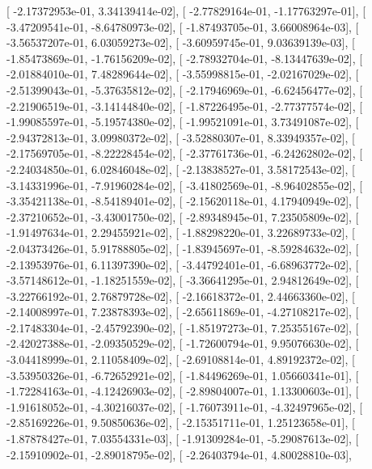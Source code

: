 \documentclass{article}
\begin{document}
       [ -2.17372953e-01,   3.34139414e-02],
       [ -2.77829164e-01,  -1.17763297e-01],
       [ -3.47209541e-01,  -8.64780973e-02],
       [ -1.87493705e-01,   3.66008964e-03],
       [ -3.56537207e-01,   6.03059273e-02],
       [ -3.60959745e-01,   9.03639139e-03],
       [ -1.85473869e-01,  -1.76156209e-02],
       [ -2.78932704e-01,  -8.13447639e-02],
       [ -2.01884010e-01,   7.48289644e-02],
       [ -3.55998815e-01,  -2.02167029e-02],
       [ -2.51399043e-01,  -5.37635812e-02],
       [ -2.17946969e-01,  -6.62456477e-02],
       [ -2.21906519e-01,  -3.14144840e-02],
       [ -1.87226495e-01,  -2.77377574e-02],
       [ -1.99085597e-01,  -5.19574380e-02],
       [ -1.99521091e-01,   3.73491087e-02],
       [ -2.94372813e-01,   3.09980372e-02],
       [ -3.52880307e-01,   8.33949357e-02],
       [ -2.17569705e-01,  -8.22228454e-02],
       [ -2.37761736e-01,  -6.24262802e-02],
       [ -2.24034850e-01,   6.02846048e-02],
       [ -2.13838527e-01,   3.58172543e-02],
       [ -3.14331996e-01,  -7.91960284e-02],
       [ -3.41802569e-01,  -8.96402855e-02],
       [ -3.35421138e-01,  -8.54189401e-02],
       [ -2.15620118e-01,   4.17940949e-02],
       [ -2.37210652e-01,  -3.43001750e-02],
       [ -2.89348945e-01,   7.23505809e-02],
       [ -1.91497634e-01,   2.29455921e-02],
       [ -1.88298220e-01,   3.22689733e-02],
       [ -2.04373426e-01,   5.91788805e-02],
       [ -1.83945697e-01,  -8.59284632e-02],
       [ -2.13953976e-01,   6.11397390e-02],
       [ -3.44792401e-01,  -6.68963772e-02],
       [ -3.57148612e-01,  -1.18251559e-02],
       [ -3.36641295e-01,   2.94812649e-02],
       [ -3.22766192e-01,   2.76879728e-02],
       [ -2.16618372e-01,   2.44663360e-02],
       [ -2.14008997e-01,   7.23878393e-02],
       [ -2.65611869e-01,  -4.27108217e-02],
       [ -2.17483304e-01,  -2.45792390e-02],
       [ -1.85197273e-01,   7.25355167e-02],
       [ -2.42027388e-01,  -2.09350529e-02],
       [ -1.72600794e-01,   9.95076630e-02],
       [ -3.04418999e-01,   2.11058409e-02],
       [ -2.69108814e-01,   4.89192372e-02],
       [ -3.53950326e-01,  -6.72652921e-02],
       [ -1.84496269e-01,   1.05660341e-01],
       [ -1.72284163e-01,  -4.12426903e-02],
       [ -2.89804007e-01,   1.13300603e-01],
       [ -1.91618052e-01,  -4.30216037e-02],
       [ -1.76073911e-01,  -4.32497965e-02],
       [ -2.85169226e-01,   9.50850636e-02],
       [ -2.15351711e-01,   1.25123658e-01],
       [ -1.87878427e-01,   7.03554331e-03],
       [ -1.91309284e-01,  -5.29087613e-02],
       [ -2.15910902e-01,  -2.89018795e-02],
       [ -2.26403794e-01,   4.80028810e-03],
\end{document}
